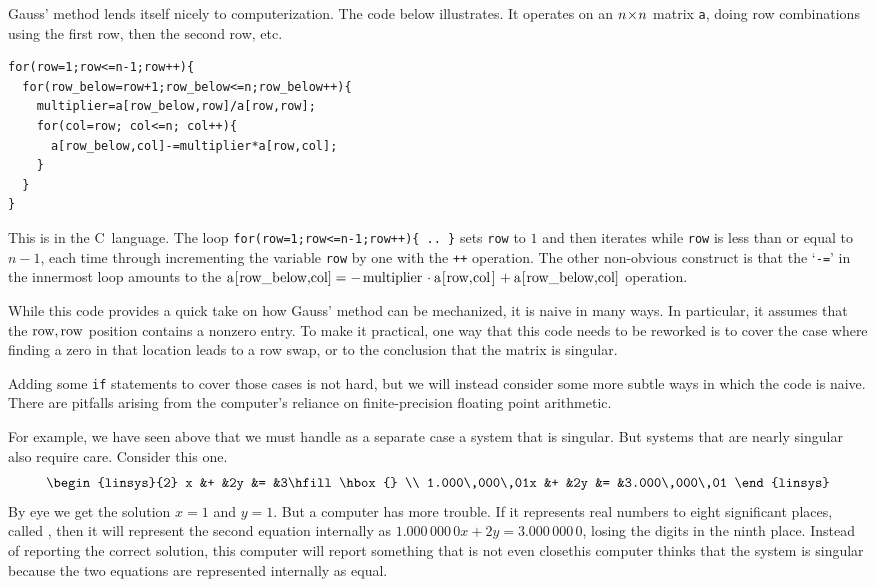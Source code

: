 Gauss' method lends itself nicely to computerization.
The code below illustrates.
It operates on an $n \! \times \! n$ matrix \texttt{a}, 
doing row combinations using the first row, then
the second row, etc.
\begin{lstlisting}
for(row=1;row<=n-1;row++){
  for(row_below=row+1;row_below<=n;row_below++){
    multiplier=a[row_below,row]/a[row,row];
    for(col=row; col<=n; col++){
      a[row_below,col]-=multiplier*a[row,col];
    }
  }
}
\end{lstlisting}
This is in the C~language.
The loop 
\lstinline!for(row=1;row<=n-1;row++){ .. }!
sets \texttt{row} to $1$ and then iterates while
\texttt{row} is less than or equal to $n-1$, each time through
incrementing the variable \lstinline!row! by one with the 
\lstinline!++! operation.
The other non-obvious construct is that the `\texttt{-=}' in the innermost
loop amounts to the
$\text{\lstinline!a[row\_below,col]!}=
           -\text{\lstinline!multiplier!}\cdot\text{\lstinline!a[row,col]!}
           +\text{\lstinline!a[row\_below,col]!}$
operation.

While this code provides a quick take on how Gauss' method can be
mechanized, it is naive in many ways.
In particular, it assumes that 
the $\text{\lstinline!row!},\text{\lstinline!row!}$ position contains
a nonzero entry.
To make it practical, 
one way that this code needs to be reworked is to cover
the case where finding a zero in that location leads to a row swap, or to the
conclusion that the matrix is singular.

Adding some \lstinline!if! statements to cover those cases is not hard,
but we will instead consider some more subtle ways in which the code is naive.
There are pitfalls arising from the computer's reliance on finite-precision
floating point arithmetic.

For example, we have seen above that we must handle as a separate case a
system that is singular.
But systems that are nearly singular also require care.
Consider this one.
\begin{equation*}
   \begin{linsys}{2}
                   x &+ &2y &= &3\hfill\hbox{}  \\
     1.000\,000\,01x &+ &2y &= &3.000\,000\,01
   \end{linsys}
\end{equation*}
By eye we get the solution $x=1$ and $y=1$.
But a computer has more trouble.
If it represents real numbers to eight significant places, called 
, 
then it will represent the second
equation internally as $1.000\,000\,0x+2y=3.000\,000\,0$, losing the
digits in the ninth place.
Instead of reporting the correct solution, this computer will report something
that is not even close\Dash this computer thinks that the system is singular
because the two equations are represented internally as equal.

